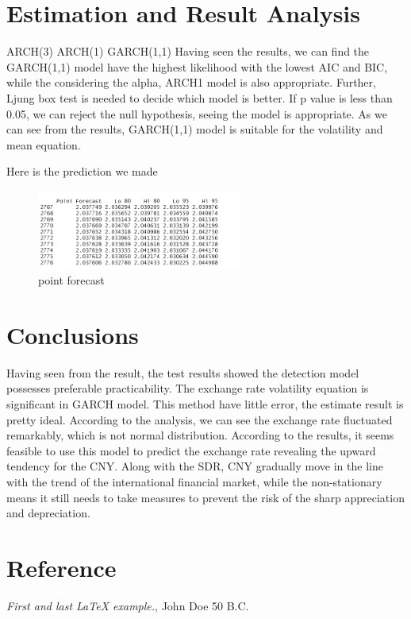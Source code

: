 \documentclass[12pt, a4paper, titlepage]{article}
\begin{document}
\section{Estimation and Result Analysis}
ARCH(3)
ARCH(1)
GARCH(1,1)
Having seen the results, we can find the GARCH(1,1) model have the highest likelihood with the lowest AIC and BIC, while the considering the alpha, ARCH1 model is also appropriate.
Further, Ljung box test is needed to decide which model is better.
If p value is less than 0.05, we can reject the null hypothesis, seeing the model is appropriate.
As we can see from the results, GARCH(1,1) model is suitable for the volatility and mean equation.

Here is the prediction we made
\begin{figure}
\begin{center}
\caption{point forecast}\label{pre}
\includegraphics[width=0.6\textwidth]{pre.png}
\end{center}
\end{figure}


\section{Conclusions}\label{conclusions}
Having seen from the result, the test results showed the detection model possesses preferable practicability. The exchange rate volatility equation is significant in GARCH model.
This method have little error, the estimate result is pretty ideal. According to the analysis, we can see the exchange rate fluctuated remarkably, which is not normal distribution. According to the results, it seems feasible to use this model to predict the exchange rate revealing the upward tendency for the CNY. Along with the SDR, CNY gradually move in the line with the trend of the international financial market, while the non-stationary means it still needs to take measures to prevent the risk of the sharp appreciation and depreciation.


\section{Reference}
\begin{thebibliography}{9}
 \emph{First and last \LaTeX{} example.},
John Doe 50 B.C.
 
\end{thebibliography}
\end{document}
